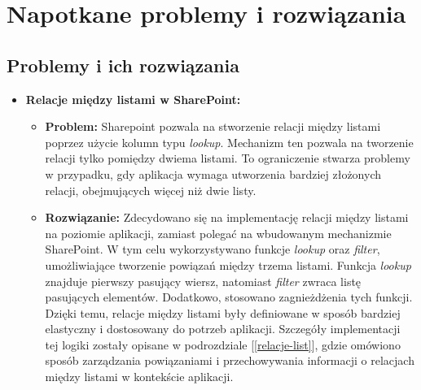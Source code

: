 \chapter{Napotkane problemy i rozwiązania}

\section*{Problemy i ich rozwiązania}

\begin{itemize}
      \item \textbf{Relacje między listami w SharePoint:}
            \begin{itemize}
                  \item \textbf{Problem:}
                        Sharepoint pozwala na stworzenie relacji między listami poprzez użycie kolumn typu \emph{lookup}. Mechanizm ten pozwala na tworzenie relacji tylko pomiędzy dwiema listami. To ograniczenie stwarza problemy w przypadku, gdy aplikacja wymaga utworzenia bardziej złożonych relacji, obejmujących więcej niż dwie listy.
                  \item \textbf{Rozwiązanie:} Zdecydowano się na implementację relacji między listami na poziomie aplikacji, zamiast polegać na wbudowanym mechanizmie SharePoint. W tym celu wykorzystywano funkcje \emph{lookup} oraz \emph{filter}, umożliwiające tworzenie powiązań między trzema listami. Funkcja \emph{lookup} znajduje pierwszy pasujący wiersz, natomiast \emph{filter} zwraca listę pasujących elementów. Dodatkowo, stosowano zagnieżdżenia tych funkcji. Dzięki temu, relacje między listami były definiowane w sposób bardziej elastyczny i dostosowany do potrzeb aplikacji. Szczegóły implementacji tej logiki zostały opisane w podrozdziale [\ref{relacje-list}], gdzie omówiono sposób zarządzania powiązaniami i przechowywania informacji o relacjach między listami w kontekście aplikacji.
            \end{itemize}


\end{itemize}
